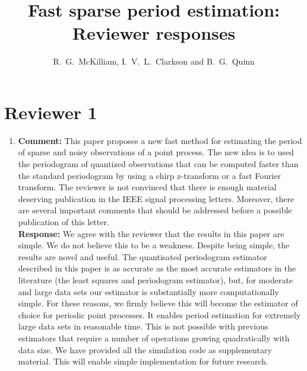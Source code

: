 \documentclass[a4paper,10pt]{article}
\title{Fast sparse period estimation: Reviewer responses}
\author{R.~G.~McKilliam, I.~V.~L.~Clarkson and B.~G.~Quinn 
}
\begin{document}
\maketitle


\section*{Reviewer 1}\label{sec:reviewer-1}

\begin{enumerate}
 
\item\textbf{Comment:}
This paper proposes a new fast method for estimating the period of sparse and noisy
observations of a point process. The new idea is to used the periodogram of quantized
observations that can be computed faster than the standard periodogram by using
a chirp z-transform or a fast Fourier transform. The reviewer is not convinced that
there is enough material deserving publication in the IEEE signal processing letters.
Moreover, there are several important comments that should be addressed before a
possible publication of this letter.
\\
\textbf{Response:}
We agree with the reviewer that the results in this paper are simple.  We do not believe this to be a weakness. Despite being simple, the results are novel and useful.  The quantisated periodogram estimator described in this paper is as accurate as the most accurate estimators in the literature (the least squares and periodogram estimator),  but, for moderate and large data sets our estimator is substantially more computationally simple.  For these reasons, we firmly believe this will become the estimator of choice for periodic point processes.  It enables period estimation for extremely large data sets in reasonable time. This is not possible with previous estimators that require a number of operations growing quadratically with data size. We have provided all the simulation code as supplementary material.  This will enable simple implementation for future research.


\end{enumerate}
\end{document}
